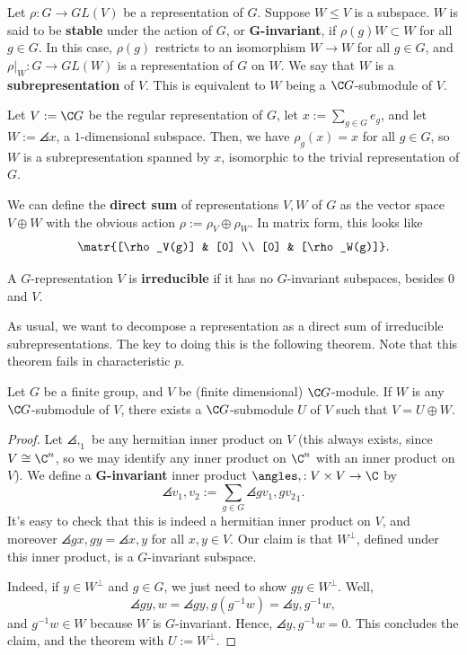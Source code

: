\begin{defn}
    Let $\rho :G \to GL(V)$ be a representation of $G$. Suppose $W \leq V$ is a subspace. $W$ is said to be \textbf{stable} under the action of $G$, or \textbf{$\bm G$-invariant}, if $\rho (g)W \subset W$ for all $g \in G$. In this case, $\rho (g)$ restricts to an isomorphism $W \to W$ for all $g \in G$, and $\rho |_W : G \to GL(W)$ is a representation of $G$ on $W$. We say that $W$ is a \textbf{subrepresentation} of $V$. This is equivalent to $W$ being a $\C G$-submodule of $V$.
\end{defn}

\begin{ex}
    Let $V:= \C G$ be the regular representation of $G$, let $x:= \sum_{ g\in G}e_g$, and let $W:= \angles {x}$, a $1$-dimensional subspace. Then, we have $\rho _g(x) = x$ for all $g \in G$, so $W$ is a subrepresentation spanned by $x$, isomorphic to the trivial representation of $G$.
\end{ex}

\begin{defn}
    We can define the \textbf{direct sum} of representations $V,W$ of $G$ as the vector space $V \oplus W$ with the obvious action $\rho := \rho _V \oplus \rho_W$. In matrix form, this looks like
    $$\matr{[\rho_V(g)] & [0] \\ [0] & [\rho _W(g)]}.$$
\end{defn}

\begin{defn}
    A $G$-representation $V$ is \textbf{irreducible} if it has no $G$-invariant subspaces, besides $0$ and $V$.
\end{defn}

As usual, we want to decompose a representation as a direct sum of irreducible subrepresentations. The key to doing this is the following theorem. Note that this theorem fails in characteristic $p$.

\begin{thm}
    Let $G$ be a finite group, and $V$ be (finite dimensional) $\C G$-module. If $W$ is any $\C G$-submodule of $V$, there exists a $\C G$-submodule $U$ of $V$ such that $V= U \oplus W$.
\end{thm}

\begin{proof}
Let $\angles ,_1$ be any hermitian inner product on $V$ (this always exists, since $V \cong \C^n$, so we may identify any inner product on $\C^n$ with an inner product on $V$). We define a \textbf{$\bm {G}$-invariant} inner product $\angles ,:V \times V \to \C$ by
$$\angles {v_1,v_2}:= \sum_{g \in G}\angles{gv_1,gv_2}_1.$$
It's easy to check that this is indeed a hermitian inner product on $V$, and moreover $\angles{gx,gy}=\angles{x,y}$ for all $x,y \in V$. Our claim is that $W ^\perp$, defined under this inner product, is a $G$-invariant subspace.

Indeed, if $y \in W^\perp$ and $g \in G$, we just need to show $gy \in W^\perp$. Well,
$$\angles{gy,w}=\angles{gy,g(g^{-1}w)}=\angles {y,g^{-1}w},$$
and $g^{-1}w \in W$ because $W$ is $G$-invariant. Hence, $\angles {y,g^{-1}w}=0$. This concludes the claim, and the theorem with $U:= W^\perp$.
\end{proof}

